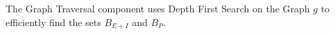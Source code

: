 %
%
%
%

The Graph Traversal component uses Depth First Search on the Graph $g$ to efficiently find the sets $B_{E+I}$ and $B_P$.
 
